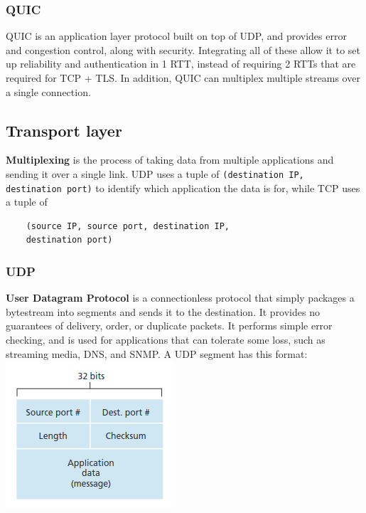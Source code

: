 \subsubsection{QUIC}
QUIC is an application layer protocol built on top of UDP, and provides error and congestion control, along with security. Integrating all of these allow it to set up reliability and authentication in 1 RTT, instead of requiring 2 RTTs that are required for TCP + TLS. In addition, QUIC can multiplex multiple streams over a single connection.

\subsection{Transport layer}
\textbf{Multiplexing} is the process of taking data from multiple applications and sending it over a single link. UDP uses a tuple of \verb|(destination IP, destination port)| to identify which application the data is for, while TCP uses a tuple of
\begin{verbatim}
	(source IP, source port, destination IP,
	destination port)
\end{verbatim}
\subsubsection{UDP}
\textbf{User Datagram Protocol} is a connectionless protocol that simply packages a bytestream into segments and sends it to the destination. It provides no guarantees of delivery, order, or duplicate packets. It performs simple error checking, and is used for applications that can tolerate some loss, such as streaming media, DNS, and SNMP. A UDP segment has this format:
\includegraphics[width=\linewidth]{../images/w4n3udpSegment.png}\\

